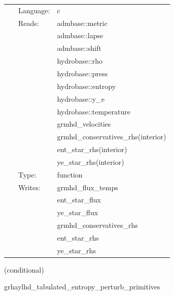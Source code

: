 \documentclass{article}
\begin{document}
\hspace{5mm}

 \begin{tabular*}{160mm}{cll} 
~ & Language:  & c \\ 
~ & Reads:  & admbase::metric \\ 
~& ~ &admbase::lapse\\ 
~& ~ &admbase::shift\\ 
~& ~ &hydrobase::rho\\ 
~& ~ &hydrobase::press\\ 
~& ~ &hydrobase::entropy\\ 
~& ~ &hydrobase::y\_e\\ 
~& ~ &hydrobase::temperature\\ 
~& ~ &grmhd\_velocities\\ 
~& ~ &grmhd\_conservatives\_rhs(interior)\\ 
~& ~ &ent\_star\_rhs(interior)\\ 
~& ~ &ye\_star\_rhs(interior)\\ 
~ & Type:  & function \\ 
~ & Writes:  & grmhd\_flux\_temps \\ 
~& ~ &ent\_star\_flux\\ 
~& ~ &ye\_star\_flux\\ 
~& ~ &grmhd\_conservatives\_rhs\\ 
~& ~ &ent\_star\_rhs\\ 
~& ~ &ye\_star\_rhs\\ 
\end{tabular*} 


\vspace{5mm}

   (conditional) 

\hspace{5mm} grhaylhd\_tabulated\_entropy\_perturb\_primitives 

\hspace{5mm}{\it entropy+tabulated version of grhaylhd\_perturb\_primitives } 


\hspace{5mm}
\end{document}
